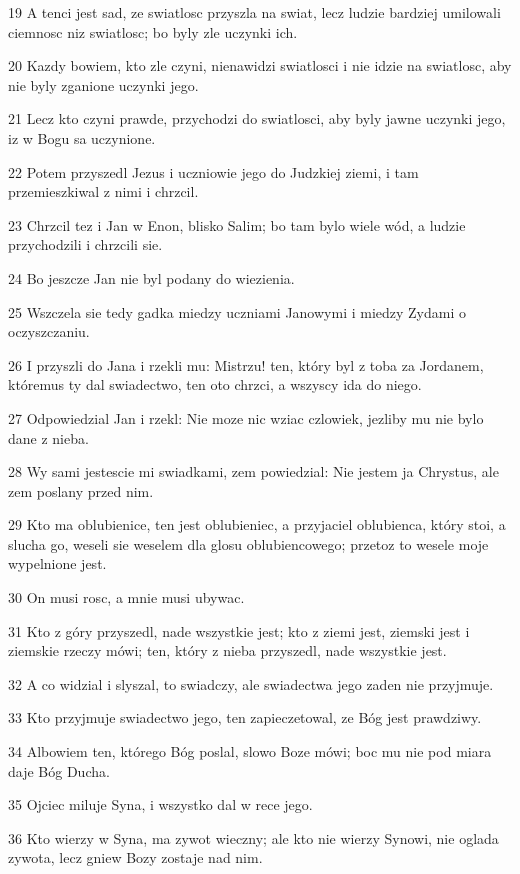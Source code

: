 \par 19 A tenci jest sad, ze swiatlosc przyszla na swiat, lecz ludzie bardziej umilowali ciemnosc niz swiatlosc; bo byly zle uczynki ich.
\par 20 Kazdy bowiem, kto zle czyni, nienawidzi swiatlosci i nie idzie na swiatlosc, aby nie byly zganione uczynki jego.
\par 21 Lecz kto czyni prawde, przychodzi do swiatlosci, aby byly jawne uczynki jego, iz w Bogu sa uczynione.
\par 22 Potem przyszedl Jezus i uczniowie jego do Judzkiej ziemi, i tam przemieszkiwal z nimi i chrzcil.
\par 23 Chrzcil tez i Jan w Enon, blisko Salim; bo tam bylo wiele wód, a ludzie przychodzili i chrzcili sie.
\par 24 Bo jeszcze Jan nie byl podany do wiezienia.
\par 25 Wszczela sie tedy gadka miedzy uczniami Janowymi i miedzy Zydami o oczyszczaniu.
\par 26 I przyszli do Jana i rzekli mu: Mistrzu! ten, który byl z toba za Jordanem, któremus ty dal swiadectwo, ten oto chrzci, a wszyscy ida do niego.
\par 27 Odpowiedzial Jan i rzekl: Nie moze nic wziac czlowiek, jezliby mu nie bylo dane z nieba.
\par 28 Wy sami jestescie mi swiadkami, zem powiedzial: Nie jestem ja Chrystus, ale zem poslany przed nim.
\par 29 Kto ma oblubienice, ten jest oblubieniec, a przyjaciel oblubienca, który stoi, a slucha go, weseli sie weselem dla glosu oblubiencowego; przetoz to wesele moje wypelnione jest.
\par 30 On musi rosc, a mnie musi ubywac.
\par 31 Kto z góry przyszedl, nade wszystkie jest; kto z ziemi jest, ziemski jest i ziemskie rzeczy mówi; ten, który z nieba przyszedl, nade wszystkie jest.
\par 32 A co widzial i slyszal, to swiadczy, ale swiadectwa jego zaden nie przyjmuje.
\par 33 Kto przyjmuje swiadectwo jego, ten zapieczetowal, ze Bóg jest prawdziwy.
\par 34 Albowiem ten, którego Bóg poslal, slowo Boze mówi; boc mu nie pod miara daje Bóg Ducha.
\par 35 Ojciec miluje Syna, i wszystko dal w rece jego.
\par 36 Kto wierzy w Syna, ma zywot wieczny; ale kto nie wierzy Synowi, nie oglada zywota, lecz gniew Bozy zostaje nad nim.

